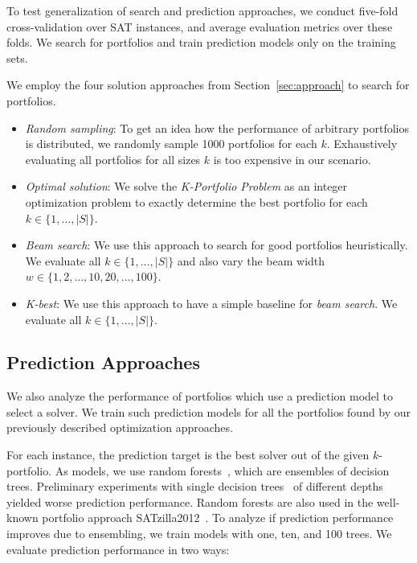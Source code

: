 \documentclass[conference]{IEEEtran}
\begin{document}
To test generalization of search and prediction approaches, we conduct five-fold cross-validation over SAT instances, and average evaluation metrics over these folds. 
We search for portfolios and train prediction models only on the training sets.

We employ the four solution approaches from Section~\ref{sec:approach} to search for portfolios.

\begin{itemize}
	\item \emph{Random sampling}:
	To get an idea how the performance of arbitrary portfolios is distributed, we randomly sample 1000 portfolios for each $k$.
	Exhaustively evaluating all portfolios for all sizes $k$ is too expensive in our scenario.
	\item \emph{Optimal solution}:
	We solve the \emph{K-Portfolio Problem} as an integer optimization problem to exactly determine the best portfolio for each $k \in \{1, \dots, |S|\}$.
	\item \emph{Beam search}: 
	We use this approach to search for good portfolios heuristically.
	We evaluate all $k \in \{1, \dots, |S|\}$ and also vary the beam width $w \in \{1, 2, \dots, 10, 20, \dots, 100\}$.
	\item \emph{K-best}:
	We use this approach to have a simple baseline for \emph{beam search}.
	We evaluate all $k \in \{1, \dots, |S|\}$.
\end{itemize}

\subsection{Prediction Approaches}

We also analyze the performance of portfolios which use a prediction model to select a solver. 
We train such prediction models for all the portfolios found by our previously described optimization approaches. 

For each instance, the prediction target is the best solver out of the given $k$-portfolio.
As models, we use random forests~\cite{breiman2001random}, which are ensembles of decision trees. 
Preliminary experiments with single decision trees~\cite{breiman1984classification} of different depths yielded worse prediction performance. 
Random forests are also used in the well-known portfolio approach SATzilla2012~\cite{xu2012satzilla2012}. 
To analyze if prediction performance improves due to ensembling, we train models with one, ten, and 100 trees.
We evaluate prediction performance in two ways:
\end{document}

